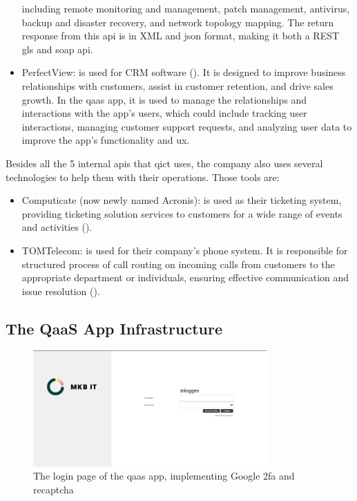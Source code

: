 \begin{multicols}{2}
\begin{itemize}
                  including remote monitoring and management, patch management, antivirus, backup and disaster
                  recovery, and network topology mapping. The return response from this \acrshort{api} is in \gls{XML}
                  and \acrshort{json} format, making it both a \gls{REST gls} and \acrshort{soap} \acrshort{api}.
            \item PerfectView: is used for \gls{CRM} software (\textit{\cite{perfectView}}). It is designed to
                  improve business relationships with customers, assist in customer retention, and drive sales growth.
                  In the \acrshort{qaas} app, it is used to manage the relationships and interactions with the app's users,
                  which could include tracking user interactions, managing customer support requests, and analyzing user
                  data to improve the app's functionality and \acrshort{ux}.
      \end{itemize}

      Besides all the 5 internal \acrshort{api}s that \acrshort{qict} uses, the company also uses several technologies to help them with their
      operations. Those tools are:

      \begin{itemize}
            \item Computicate (now newly named Acronis): is used as their ticketing system, providing ticketing solution services to customers for
                  a wide range of events and activities (\textit{\cite{computicate}}).
            \item TOMTelecom: is used for their company's phone system. It is responsible for structured process of call routing on incoming calls
                  from customers to the appropriate department or individuals, ensuring effective communication and issue resolution
                  (\textit{\cite{tomTelecom}}).
      \end{itemize}

      \subsection{The QaaS App Infrastructure}
\end{multicols}

\begin{figure}[htbp]
      \centering
      \includegraphics[width=0.8\textwidth]{Figures/Qaas App/Landing Page.png}
      \caption{The login page of the \acrshort{qaas} app, implementing Google \acrshort{2fa} and re\acrshort{captcha}}
\end{figure}

